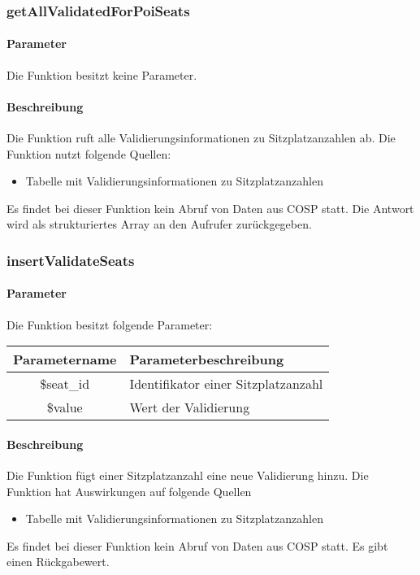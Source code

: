 \subsubsection{getAllValidatedForPoiSeats}
\paragraph{Parameter} Die Funktion besitzt keine Parameter.
\paragraph{Beschreibung} Die Funktion ruft alle Validierungsinformationen zu Sitzplatzanzahlen ab. Die Funktion nutzt folgende Quellen:
\begin{itemize}
	\item Tabelle mit Validierungsinformationen zu Sitzplatzanzahlen
\end{itemize}
Es findet bei dieser Funktion kein Abruf von Daten aus {\glqq COSP\grqq} statt. Die Antwort wird als strukturiertes Array an den Aufrufer zurückgegeben.
\subsubsection{insertValidateSeats}
\paragraph{Parameter} Die Funktion besitzt folgende Parameter:
\begin{table}[H]
	\begin{tabular}{|c|p{11cm}|}
		\hline
		\textbf{Parametername} & \textbf{Parameterbeschreibung} \\ \hline
		\$seat\_id & Identifikator einer Sitzplatzanzahl \\ \hline
		\$value    & Wert der Validierung \\ \hline
	\end{tabular}
\end{table}
\paragraph{Beschreibung} Die Funktion fügt einer Sitzplatzanzahl eine neue Validierung hinzu. Die Funktion hat Auswirkungen auf folgende Quellen
\begin{itemize}
	\item Tabelle mit Validierungsinformationen zu Sitzplatzanzahlen
\end{itemize}
Es findet bei dieser Funktion kein Abruf von Daten aus {\glqq COSP\grqq} statt. Es gibt einen Rückgabewert.
